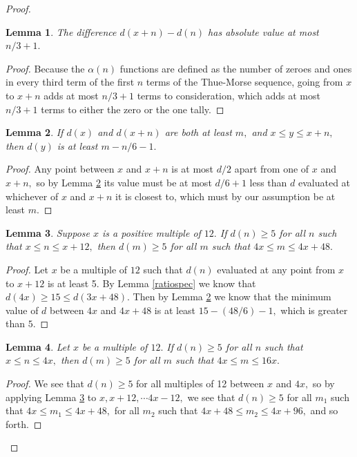 \documentclass{article}
\newtheorem{lemma}{Lemma}[section]
\begin{document}
\begin{proof}

\begin{lemma}
\label{diff}
The difference $d(x+n) - d(n)$ has absolute value at most $n/3 + 1.$
\end{lemma}

\begin{proof}
Because the $\alpha(n)$ functions are defined as the number of zeroes and ones in every third term of the first $n$ terms of the Thue-Morse sequence, going from $x$ to $x+n$ adds at most $n/3 + 1$ terms to consideration, which adds at most $n/3 + 1$ terms to either the zero or the one tally.
\end{proof}

\begin{lemma}
\label{dip}
If $d(x)$ and $d(x+n)$ are both at least $m,$ and $x \leq y \leq x+n,$ then $d(y)$ is at least $m - n/6 - 1.$
\end{lemma}

\begin{proof}
Any point between $x$ and $x+n$ is at most $d/2$ apart from one of $x$ and $x+n,$ so by Lemma \ref{dip} its value must be at most $d/6 + 1$ less than $d$ evaluated at whichever of $x$ and $x+n$ it is closest to, which must by our assumption be at least $m.$
\end{proof}

\begin{lemma}
\label{x12}
Suppose $x$ is a positive multiple of $12.$ If $d(n) \geq 5$ for all $n$ such that $x \leq n \leq x+12,$ then $d(m) \geq 5$ for all $m$ such that $4x \leq m \leq 4x+48.$
\end{lemma}

\begin{proof}
Let $x$ be a multiple of $12$ such that $d(n)$ evaluated at any point from $x$ to $x+12$ is at least 5. By Lemma \ref{ratiospec} we know that $d(4x) \geq 15 \leq d(3x+48).$ Then by Lemma \ref{dip} we know that the minimum value of $d$ between $4x$ and $4x+48$ is at least $15 - (48/6) - 1,$ which is greater than $5.$
\end{proof}

\begin{lemma}
\label{4jump}
Let $x$ be a multiple of $12.$ If $d(n) \geq 5$ for all $n$ such that $x \leq n \leq 4x,$ then $d(m) \geq 5$ for all $m$ such that $4x \leq m \leq 16x.$
\end{lemma}

\begin{proof}
We see that $d(n) \geq 5$ for all multiples of 12 between $x$ and $4x,$ so by applying Lemma \ref{x12} to $x, x+12, \cdots 4x-12,$ we see that $d(n) \geq 5$ for all $m_1$ such that $4x \leq m_1 \leq 4x+48,$ for all $m_2$ such that $4x+48 \leq m_2 \leq 4x+96,$ and so forth.
\end{proof}


\end{proof}
\end{document}
